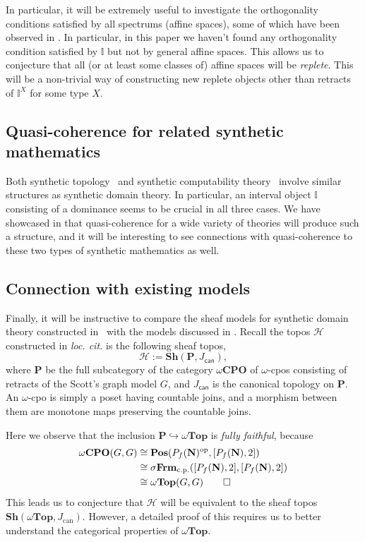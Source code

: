 \documentclass[12pt]{amsart}
\theoremstyle{definition}
\newcommand{\mc}[1]{\mathcal{#1}}
\newcommand{\mb}[1]{\mathbf{#1}}
\newcommand{\mbb}[1]{\mathbb{#1}}
\newcommand{\I}{\mbb I}
\newcommand{\mr}[1]{\mathrm{#1}}
\newcommand{\ms}[1]{\mathsf{#1}}
\newcommand{\Pos}{\mb{Pos}}
\newcommand{\sh}{\mb{Sh}}
\newcommand{\op}{^{\mathrm{op}}}
\newcommand{\hook}{\hookrightarrow}
\newcommand{\cp}{_{\mr{c.p.}}}
\newcommand{\N}{\mb N}
\newcommand{\wCPO}{\omega\mb{CPO}}
\newcommand{\sFrm}{\sigma\mb{Frm}}
\newcommand{\wTop}{\omega\mb{Top}}
\begin{document}
In particular, it will be extremely useful to investigate the orthogonality conditions satisfied by all spectrums (affine spaces), some of which have been observed in . In particular, in this paper we haven't found any orthogonality condition satisfied by $\I$ but not by general affine spaces. This allows us to conjecture that all (or at least some classes of) affine spaces will be \emph{replete}. This will be a non-trivial way of constructing new replete objects other than retracts of $\I^X$ for some type $X$.

\subsection{Quasi-coherence for related synthetic mathematics}

Both synthetic topology~\cite{bauer2009dedekind} and synthetic computability theory~\cite{RN552} involve similar structures as synthetic domain theory. In particular, an interval object $\I$ consisting of a dominance seems to be crucial in all three cases. We have showcased in  that quasi-coherence for a wide variety of theories will produce such a structure, and it will be interesting to see connections with quasi-coherence to these two types of synthetic mathematics as well.

\subsection{Connection with existing models}\label{subsec:compare}

Finally, it will be instructive to compare the sheaf models for synthetic domain theory constructed in~\cite{FIORE1997151} with the models discussed in . Recall the topos $\mc H$ constructed in \emph{loc. cit.} is the following sheaf topos,
\[ \mc H := \sh(\mb P,J_{\ms{can}}), \]
where $\mb P$ be the full subcategory of the category $\wCPO$ of $\omega$-cpos consisting of retracts of the Scott's graph model $G$, and $J_{\ms{can}}$ is the canonical topology on $\mb P$. An $\omega$-cpo is simply a poset having countable joins, and a morphism between them are monotone maps preserving the countable joins.

Here we observe that the inclusion $\mb P \hook \wTop$ is \emph{fully faithful}, because
\begin{align*}
  \wCPO(G,G)
  &\cong \Pos(P_f(\N)\op,[P_f(\N),2]) \\
  &\cong \sFrm\cp([P_f(\N),2],[P_f(\N),2]) \\ 
  &\cong \wTop(G,G) \qedhere
\end{align*}
This leads us to conjecture that $\mc H$ will be equivalent to the sheaf topos $\sh(\wTop,J_{\mr{can}})$. However, a detailed proof of this requires us to better understand the categorical properties of $\wTop$.
\end{document}
